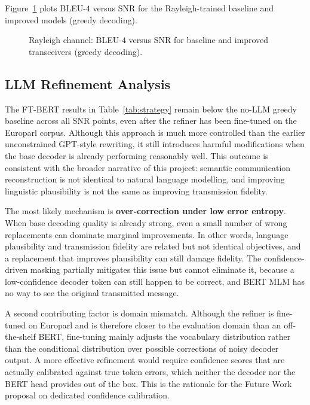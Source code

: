 Figure~\ref{fig:bleu_rayleigh} plots BLEU-$4$ versus SNR for the Rayleigh-trained baseline and improved models (greedy decoding).
\begin{figure}[!htb]
\centering
{}
\caption{Rayleigh channel: BLEU-$4$ versus SNR for baseline and improved transceivers (greedy decoding).}
\label{fig:bleu_rayleigh}
\end{figure}
\FloatBarrier

\subsection{LLM Refinement Analysis}

The FT-BERT results in Table~\ref{tab:strategy} remain below the no-LLM greedy baseline across all SNR points, even after the refiner has been fine-tuned on the Europarl corpus. Although this approach is much more controlled than the earlier unconstrained GPT-style rewriting, it still introduces harmful modifications when the base decoder is already performing reasonably well. This outcome is consistent with the broader narrative of this project: semantic communication reconstruction is not identical to natural language modelling, and improving linguistic plausibility is not the same as improving transmission fidelity.

The most likely mechanism is \textbf{over-correction under low error entropy}. When base decoding quality is already strong, even a small number of wrong replacements can dominate marginal improvements. In other words, language plausibility and transmission fidelity are related but not identical objectives, and a replacement that improves plausibility can still damage fidelity. The confidence-driven masking partially mitigates this issue but cannot eliminate it, because a low-confidence decoder token can still happen to be correct, and BERT MLM has no way to see the original transmitted message.

A second contributing factor is domain mismatch. Although the refiner is fine-tuned on Europarl and is therefore closer to the evaluation domain than an off-the-shelf BERT, fine-tuning mainly adjusts the vocabulary distribution rather than the conditional distribution over possible corrections of noisy decoder output. A more effective refinement would require confidence scores that are actually calibrated against true token errors, which neither the decoder nor the BERT head provides out of the box. This is the rationale for the Future Work proposal on dedicated confidence calibration.

